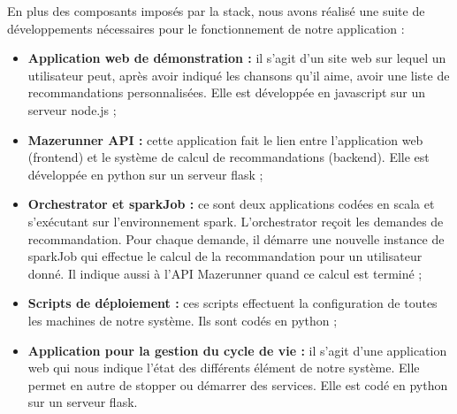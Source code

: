 En plus des composants imposés par la stack, nous avons réalisé une suite de développements nécessaires pour le fonctionnement de notre application : 
\begin{itemize}
	\item \textbf{Application web de démonstration :} il s'agit d'un site web sur lequel un utilisateur peut, après avoir indiqué les chansons qu'il aime, avoir une liste de recommandations personnalisées. Elle est développée en javascript sur un serveur node.js ;
	\item \textbf{Mazerunner API :} cette application fait le lien entre l'application web (frontend) et le système de calcul de recommandations (backend). Elle est développée en python sur un serveur flask ;
	\item \textbf{Orchestrator et sparkJob :} ce sont deux applications codées en scala et s'exécutant sur l'environnement spark. L'orchestrator reçoit les demandes de recommandation. Pour chaque demande, il démarre une nouvelle instance de sparkJob qui effectue le calcul de la recommandation pour un utilisateur donné. Il indique aussi à l'API Mazerunner quand ce calcul est terminé ;
	\item \textbf{Scripts de déploiement :} ces scripts effectuent la configuration de toutes les machines de notre système. Ils sont codés en python ;
	\item \textbf{Application pour la gestion du cycle de vie :} il s'agit d'une application web qui nous indique l'état des différents élément de notre système. Elle permet en autre de stopper ou démarrer des services. Elle est codé en python sur un serveur flask.
\end{itemize}